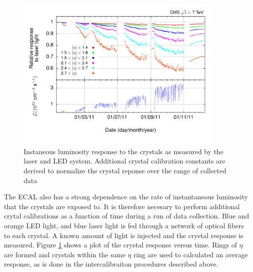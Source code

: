\begin{figure}[h]
   \centering
  \includegraphics[width=0.9\textwidth]{Figures/Reconstruction_Diagrams/ECAL_inst_lumi_laser_calibration.pdf}
  \caption{Instaneous luminosity response to the crystals as measured
    by the laser and LED system.  Additional crystal calibration
    constants are derived to normalize the crystal reponse over the
    range of collected data} \label{fig:ecal_laser}
\end{figure}

\par The ECAL also has a strong dependence on the rate of
instantaneous luminosity that the crystals are exposed to.  It is
therefore necesary to perform additional crytal calibrations as a
function of time during a run of data collection.  Blue and orange
LED light, and blue laser light is fed through a network of optical
fibers to each crystal.  A known amount of light is injected and the
crystal response is measured.  Figure \ref{fig:ecal_laser} shows a
plot of the crystal response versus time.  Rings of $\eta$ are formed
and crystals within the same $\eta$ ring are used to calculated an
average response, as is done in the intercalibraiton procedures
described above.   

